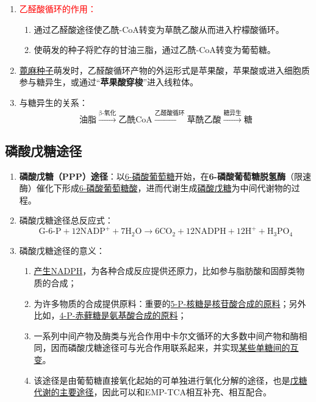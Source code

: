 \begin{enumerate}
    \item \textcolor{red}{乙醛酸循环的作用：}
    \begin{enumerate}
        \item 通过乙醛酸途径使乙酰-CoA转变为草酰乙酸从而进入柠檬酸循环。
        \item 使萌发的种子将贮存的甘油三脂，通过乙酰-CoA转变为葡萄糖。 
    \end{enumerate}
    \item \uline{蓖麻种子}萌发时，乙醛酸循环产物的外运形式是苹果酸，苹果酸或进入细胞质参与糖异生，或通过“\textbf{苹果酸穿梭}”进入线粒体。
    \item 与糖异生的关系：
    \[
        \text{油脂}\overset{\text{β-氧化}}\longrightarrow\text{乙酰CoA}\overset{\text{乙醛酸循环}}\longrightarrow\text{草酰乙酸}\overset{糖异生}\longrightarrow\text{糖}
    \]
\end{enumerate}

\subsection{磷酸戊糖途径}
\begin{enumerate}
    \item \textbf{磷酸戊糖（PPP）途径}：以\uline{6-磷酸葡萄糖}开始，在\textbf{6-磷酸葡萄糖脱氢酶}（限速酶）催化下形成\uline{6-磷酸葡萄糖酸}，进而代谢生成\uline{磷酸戊糖}为中间代谢物的过程。
    \item 磷酸戊糖途径总反应式：
    \[
        \text{G-6-P}+12\text{NADP}^++7\text{H}_2\text{O}\to 6\text{CO}_2+12\text{NADPH}+12\text{H}^++\text{H}_3\text{PO}_4
    \]
    \item 磷酸戊糖途径的意义：
    \begin{enumerate}
        \item \uline{产生NADPH}，为各种合成反应提供还原力，比如参与脂肪酸和固醇类物质的合成；
        \item 为许多物质的合成提供原料：重要的\uline{5-P-核糖是核苷酸合成的原料}；另外比如，\uline{4-P-赤藓糖是氨基酸合成的原料}；
        \item 一系列中间产物及酶类与光合作用中卡尔文循环的大多数中间产物和酶相同，因而磷酸戊糖途径可与光合作用联系起来，并实现\uline{某些单糖间的互变}。
        \item 该途径是由葡萄糖直接氧化起始的可单独进行氧化分解的途径，也是\uline{戊糖代谢的主要途径}，因此可以和EMP-TCA相互补充、相互配合。
    \end{enumerate}
\end{enumerate}

